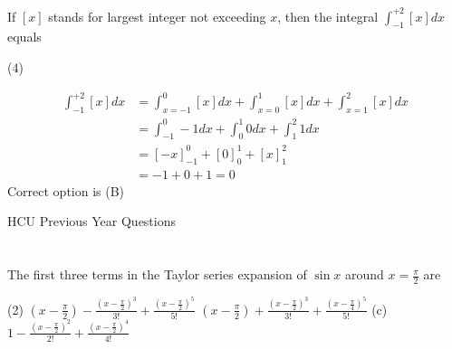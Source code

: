 \begin{questions}
	\section*{}
	
	\begin{minipage}{\textwidth}
		\question If $[x]$ stands for largest integer not exceeding $x$, then the integral $\int_{-1}^{+2}[x] d x$ equals
	\end{minipage}
	
	\begin{tasks}(4)
	\end{tasks}
	\begin{answer}
		\begin{align*}
		\int_{-1}^{+2}[x] d x&=\int_{x=-1}^{0}[x] d x+\int_{x=0}^{1}[x] d x+\int_{x=1}^{2}[x] d x \\
		&=\int_{-1}^{0} -1 d x+\int_{0}^{1} 0 d x+\int_{1}^{2} 1 d x\\
		&=\left[-x \right]_{-1} ^{0}+\left[0 \right]_{0} ^{1}+\left[x \right]_{1} ^{2}\\
		&=-1+0+1=0
		\end{align*}
		Correct option is (B)
	\end{answer}
	
	
	\begin{abox}
		HCU Previous Year Questions
	\end{abox}
	\section*{}
	
	\begin{minipage}{\textwidth}
		\question  The first three terms in the Taylor series expansion of $\sin x$ around $x=\frac{\pi}{2}$ are 
		{}
	\end{minipage}
	\begin{tasks}(2)
		\task[\textbf{A.}]$\left(x-\frac{\pi}{2}\right)-\frac{\left(x-\frac{\pi}{2}\right)^{3}}{3 !}+\frac{\left(x-\frac{\pi}{2}\right)^{5}}{5 !}$ 
		\task[\textbf{B.}]$\left(x-\frac{\pi}{2}\right)+\frac{\left(x-\frac{\pi}{2}\right)^{3}}{3 !}+\frac{\left(x-\frac{\pi}{4}\right)^{5}}{5 !}$ 
		\task[\textbf{C.}] (c) $1-\frac{\left(x-\frac{\pi}{2}\right)^{2}}{2 !}+\frac{\left(x-\frac{\pi}{2}\right)^{4}}{4 !}$
		

\end{tasks}
\end{questions}
